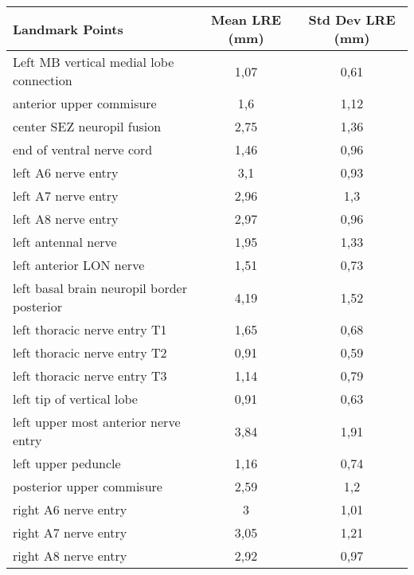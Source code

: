 \begin{tabular}{lcc}
\hline
 Landmark Points                             & Mean LRE (mm) & Std Dev LRE (mm) \\ \hline \hline
 Left MB vertical medial lobe connection     & 1,07          & 0,61             \\
 anterior upper commisure                    & 1,6           & 1,12             \\
 center SEZ neuropil fusion                  & 2,75          & 1,36             \\
 end of ventral nerve cord                   & 1,46          & 0,96             \\
 left A6 nerve entry                         & 3,1           & 0,93             \\
 left A7 nerve entry                         & 2,96          & 1,3              \\
 left A8 nerve entry                         & 2,97          & 0,96             \\
 left antennal nerve                         & 1,95          & 1,33             \\
 left anterior LON nerve                     & 1,51          & 0,73             \\
 left basal brain neuropil border posterior  & 4,19          & 1,52             \\
 left thoracic nerve entry T1                & 1,65          & 0,68             \\
 left thoracic nerve entry T2                & 0,91          & 0,59             \\
 left thoracic nerve entry T3                & 1,14          & 0,79             \\
 left tip of vertical lobe                   & 0,91          & 0,63             \\
 left upper most anterior nerve entry        & 3,84          & 1,91             \\
 left upper peduncle                         & 1,16          & 0,74             \\
 posterior upper commisure                   & 2,59          & 1,2              \\
 right A6 nerve entry                        & 3             & 1,01             \\
 right A7 nerve entry                        & 3,05          & 1,21             \\
 right A8 nerve entry                        & 2,92          & 0,97             \\

\end{tabular}
